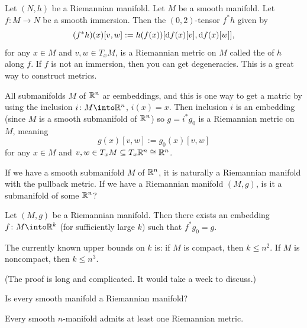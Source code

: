 \begin{example}
Let $(N,h)$ be a Riemannian manifold. Let $M$ be a smooth manifold.
Let $f\colon M\to N$ be a smooth immersion. Then the $(0,2)$-tensor
$f^{*}h$ given by
\begin{equation}
(f^{*}h)(x)[v,w]:=h(f(x))[\mathrm{d} f(x)[v],\mathrm{d} f(x)[w]],
\end{equation}
for any $x\in M$ and $v,w\in T_{x}M$, is a Riemannian metric on
$M$ called the  of $h$ along $f$.
If $f$ is not an immersion, then you can get degeneracies. This
is a great way to construct metrics.
\end{example}

\begin{example}
All submanifolds $M$ of $\mathbb{R}^{n}$ ar eembeddings, and this is one way
to get a matric by using the inclusion $i\colon M\into\RR^{n}$, $i(x)=x$.
Then inclusion $i$ is an embedding (since $M$ is a smooth submanifold
of $\mathbb{R}^{n}$) so $g=i^{*}g_{0}$ is a Riemannian metric on $M$, meaning
\begin{equation}
g(x)[v,w]:=g_{0}(x)[v,w]
\end{equation}
for any $x\in M$ and $v,w\in T_{x}M\subseteq T_{x}\mathbb{R}^{n}\cong\mathbb{R}^{n}$.
\end{example}

\begin{question}
If we have a smooth submanifold $M$ of $\mathbb{R}^{n}$, it is naturally a
Riemannian manifold with the pullback metric. If we have a Riemannian
manifold $(M,g)$, is it a submanifold of some $\mathbb{R}^{n}$?
\end{question}

\begin{theorem}
Let $(M,g)$ be a Riemannian manifold. Then there exists an embedding
$f\colon M\into\RR^{k}$ (for sufficiently large $k$) such that $f^{*}g_{0}=g$.
\end{theorem}

The currently known upper bounds on $k$ is: if $M$ is compact, then
$k\leq n^{2}$. If $M$ is noncompact, then $k\leq n^{3}$.

(The proof is long and complicated. It would take a week to discuss.)

\begin{question}
Is every smooth manifold a Riemannian manifold?
\end{question}

\begin{theorem}
Every smooth $n$-manifold admits at least one Riemannian metric.
\end{theorem}

